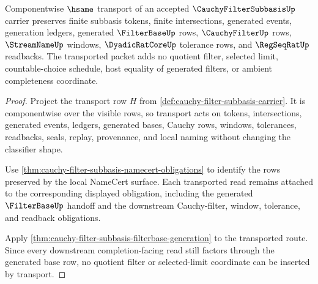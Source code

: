 \begin{theorem}
\label{thm:cauchy-filter-subbasis-window-transport}
Componentwise $\hsame$ transport of an accepted $\CauchyFilterSubbasisUp$ carrier preserves finite subbasis tokens, finite intersections, generated events, generation ledgers, generated $\FilterBaseUp$ rows, $\CauchyFilterUp$ rows, $\StreamNameUp$ windows, $\DyadicRatCoreUp$ tolerance rows, and $\RegSeqRatUp$ readbacks. The transported packet adds no quotient filter, selected limit, countable-choice schedule, host equality of generated filters, or ambient completeness coordinate.
\end{theorem}
\begin{proof}
Project the transport row $H$ from \autoref{def:cauchy-filter-subbasis-carrier}. It is componentwise over the visible rows, so transport acts on tokens, intersections, generated events, ledgers, generated bases, Cauchy rows, windows, tolerances, readbacks, seals, replay, provenance, and local naming without changing the classifier shape.

Use \autoref{thm:cauchy-filter-subbasis-namecert-obligations} to identify the rows preserved by the local NameCert surface. Each transported read remains attached to the corresponding displayed obligation, including the generated $\FilterBaseUp$ handoff and the downstream Cauchy-filter, window, tolerance, and readback obligations.

Apply \autoref{thm:cauchy-filter-subbasis-filterbase-generation} to the transported route. Since every downstream completion-facing read still factors through the generated base row, no quotient filter or selected-limit coordinate can be inserted by transport.
\end{proof}

